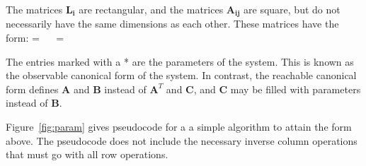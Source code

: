 The matrices $\mathbf{L_i}$ are rectangular, and the matrices
$\mathbf{A_{ij}}$ are square, but do not necessarily have the same
dimensions as each other. These matrices have the form:
\starteqnstar
{} =  ~~
 = 
\doneeqnstar

The entries marked with a * are the parameters of the system.  This is
known as the observable canonical form of the system. In contrast, the
reachable canonical form defines $\mathbf{A}$ and $\mathbf{B}$ instead
of $\mathbf{A}^T$ and $\mathbf{C}$, and $\mathbf{C}$ may be filled
with parameters instead of $\mathbf{B}$.

Figure~\ref{fig:param} gives pseudocode for a a simple algorithm to
attain the form above.  The pseudocode does not include the necessary
inverse column operations that must go with all row operations.

\newcommand{\IND}{\begin{ALC@g}}
\newcommand{\UND}{\end{ALC@g}}

